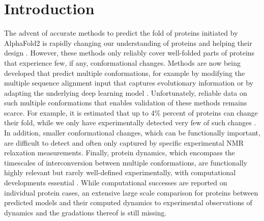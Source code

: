 \newpage

\section{Introduction}

The advent of accurate methods to predict the fold of proteins initiated by AlphaFold2 \cite{jumper_highly_2021} is rapidly changing our understanding of proteins \cite{bordin_alphafold2_2023, durairaj_uncovering_2023} and helping their design \cite{dauparas_robust_2022, watson_novo_2023, sumida_improving_2024}. However, these methods only reliably cover well-folded parts of proteins that experience few, if any, conformational changes. Methods are now being developed that predict multiple conformations, for example by modifying the multiple sequence alignment input that captures evolutionary information \cite{wayment-steele_predicting_2023} or by adapting the underlying deep learning model \cite{heo_multi-state_2022}. Unfortunately, reliable data on such multiple conformations that enables validation of these methods remains scarce. For example, it is estimated that up to 4\% percent of proteins can change their fold, while we only have experimentally detected very few of such changes \cite{porter_extant_2018}. In addition, smaller conformational changes, which can be functionally important, are difficult to detect and often only captured by specific experimental NMR relaxation measurements\cite{kovermann_2016}. Finally, protein dynamics, which encompass the timescales of interconversion between multiple conformations, are functionally highly relevant but rarely well-defined experimentally, with computational developments essential \cite{noe_machine_2020}. While computational successes are reported on individual protein cases, an extensive large scale comparison for proteins between predicted models and their computed dynamics to experimental observations of dynamics and the gradations thereof is still missing.

